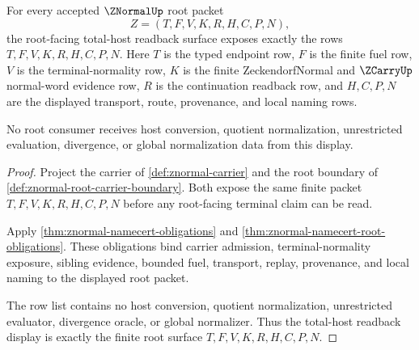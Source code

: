 \begin{theorem}
\label{thm:znormal-total-host-readback-display}
For every accepted $\ZNormalUp$ root packet
$$
Z=(T,F,V,K,R,H,C,P,N),
$$
the root-facing total-host readback surface exposes exactly the rows $T,F,V,K,R,H,C,P,N$. Here $T$ is the typed endpoint row, $F$ is the finite fuel row, $V$ is the terminal-normality row, $K$ is the finite ZeckendorfNormal and $\ZCarryUp$ normal-word evidence row, $R$ is the continuation readback row, and $H,C,P,N$ are the displayed transport, route, provenance, and local naming rows.

No root consumer receives host conversion, quotient normalization, unrestricted evaluation, divergence, or global normalization data from this display.
\end{theorem}
\begin{proof}
Project the carrier of \autoref{def:znormal-carrier} and the root boundary of \autoref{def:znormal-root-carrier-boundary}. Both expose the same finite packet $T,F,V,K,R,H,C,P,N$ before any root-facing terminal claim can be read.

Apply \autoref{thm:znormal-namecert-obligations} and \autoref{thm:znormal-namecert-root-obligations}. These obligations bind carrier admission, terminal-normality exposure, sibling evidence, bounded fuel, transport, replay, provenance, and local naming to the displayed root packet.

The row list contains no host conversion, quotient normalization, unrestricted evaluator, divergence oracle, or global normalizer. Thus the total-host readback display is exactly the finite root surface $T,F,V,K,R,H,C,P,N$.
\end{proof}

